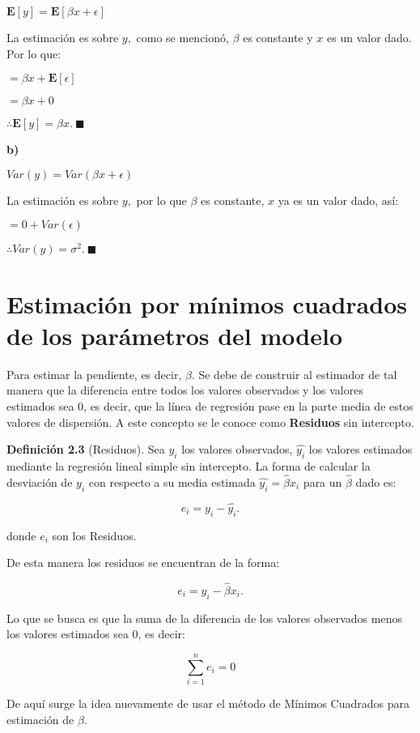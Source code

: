 \documentclass[a4paper,oneside,openany]{book}
\begin{document}
\(\mathbf{E}[y]=\mathbf{E}[\beta x + \epsilon]\)

La estimación es sobre \(y,\) como se mencionó, \(\beta\) es constante y
\(x\) es un valor dado. Por lo que:

\(=\beta x + \mathbf{E}[\epsilon]\)

\(=\beta x + 0\)

\(\therefore \mathbf{E}[y]= \beta x. \ \blacksquare\)

\textbf{b)}

\(Var(y)=Var(\beta x + \epsilon)\)

La estimación es sobre \(y,\) por lo que \(\beta\) es constante, \(x\)
ya es un valor dado, así:

\(=0+Var(\epsilon)\)

\(\therefore Var(y)=\sigma^2.\ \blacksquare\)

\section{Estimación por mínimos cuadrados de los parámetros del
modelo}\label{estimaciuxf3n-por-muxednimos-cuadrados-de-los-paruxe1metros-del-modelo-1}

Para estimar la pendiente, es decir, \(\beta.\) Se debe de construir al
estimador de tal manera que la diferencia entre todos los valores
observados y los valores estimados sea 0, es decir, que la línea de
regresión pase en la parte media de estos valores de dispersión. A este
concepto se le conoce como \textbf{Residuos} sin intercepto.

\textbf{Definición 2.3} (Residuos). Sea \(y_{i}\) los valores
observados, \(\hat{y_{i}}\) los valores estimados mediante la regresión
lineal simple sin intercepto. La forma de calcular la desviación de
\(y_{i}\) con respecto a su media estimada
\(\hat{y_{i}}=\hat{\beta}x_{i}\) para un \(\hat{\beta}\) dado es:

\[e_{i}= y_{i}-\hat{y_{i}}.\]

donde \(e_{i}\) son los Residuos.

De esta manera los residuos se encuentran de la forma:

\[e_{i}=y_{i}-\hat{\beta}x_{i}.\]

Lo que se busca es que la suma de la diferencia de los valores
observados menos los valores estimados sea 0, es decir:

\[\sum_{i=1}^{n}e_{i}=0\]

De aquí surge la idea nuevamente de usar el método de Mínimos Cuadrados
para estimación de \(\beta.\)
\end{document}
